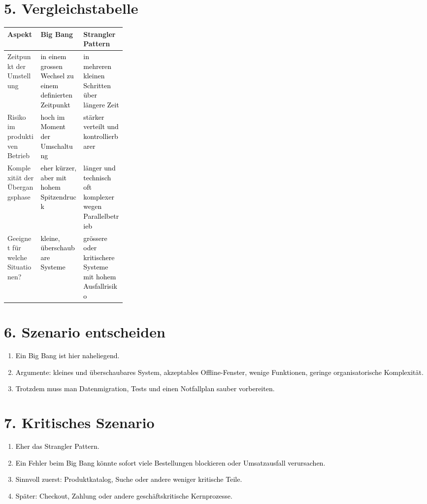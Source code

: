 \documentclass[11pt,a4paper]{article}
\newcommand{\solution}[1]{\textcolor{black}{#1}}
\begin{document}
\section*{5. Vergleichstabelle}
\begin{tabularx}{\linewidth}{|>{\raggedright\arraybackslash}p{0.28\linewidth}|>{\raggedright\arraybackslash}X|>{\raggedright\arraybackslash}X|}
\hline
\textbf{Aspekt} & \textbf{Big Bang} & \textbf{Strangler Pattern} \\
\hline
Zeitpunkt der Umstellung & \solution{in einem grossen Wechsel zu einem definierten Zeitpunkt} & \solution{in mehreren kleinen Schritten über längere Zeit} \\ \hline
Risiko im produktiven Betrieb & \solution{hoch im Moment der Umschaltung} & \solution{stärker verteilt und kontrollierbarer} \\ \hline
Komplexität der Übergangsphase & \solution{eher kürzer, aber mit hohem Spitzendruck} & \solution{länger und technisch oft komplexer wegen Parallelbetrieb} \\ \hline
Geeignet für welche Situationen? & \solution{kleine, überschaubare Systeme} & \solution{grössere oder kritischere Systeme mit hohem Ausfallrisiko} \\ \hline
\end{tabularx}

\section*{6. Szenario entscheiden}
\begin{enumerate}
  \item \solution{Ein Big Bang ist hier naheliegend.}
  \item \solution{Argumente: kleines und überschaubares System, akzeptables Offline-Fenster, wenige Funktionen, geringe organisatorische Komplexität.}
  \item \solution{Trotzdem muss man Datenmigration, Tests und einen Notfallplan sauber vorbereiten.}
\end{enumerate}

\section*{7. Kritisches Szenario}
\begin{enumerate}
  \item \solution{Eher das Strangler Pattern.}
  \item \solution{Ein Fehler beim Big Bang könnte sofort viele Bestellungen blockieren oder Umsatzausfall verursachen.}
  \item \solution{Sinnvoll zuerst: Produktkatalog, Suche oder andere weniger kritische Teile.}
  \item \solution{Später: Checkout, Zahlung oder andere geschäftskritische Kernprozesse.}
\end{enumerate}
\end{document}
